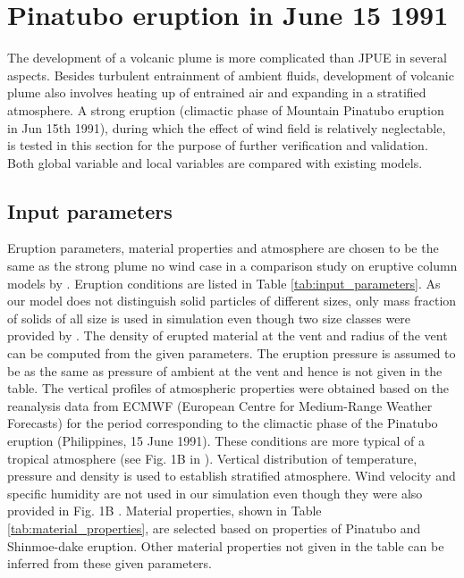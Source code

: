 \section{Pinatubo eruption in June 15 1991}
The development of a volcanic plume is more complicated than JPUE in several aspects. Besides turbulent entrainment of ambient fluids, development of volcanic plume also involves heating up of entrained air and expanding in a stratified atmosphere. A strong eruption (climactic phase of Mountain Pinatubo eruption in Jun 15th 1991), during which the effect of wind field is relatively neglectable, is tested in this section for the purpose of further verification and validation.
Both global variable and local variables are compared with existing models.

\subsection{Input parameters}
\label{input-parameter}
Eruption parameters, material properties and atmosphere are chosen to be the same as the strong plume no wind case in a comparison study on eruptive column models by \citet {costa2016results}. Eruption conditions are listed in Table \ref{tab:input_parameters}. As our model does not distinguish solid particles of different sizes, only mass fraction of solids of all size is used in simulation even though two size classes were provided by \citet {costa2016results}. The density of erupted material at the vent and radius of the vent can be computed from the given parameters. The eruption pressure is assumed to be as the same as pressure of ambient at the vent and hence is not given in the table. The vertical profiles of atmospheric properties were obtained based on the reanalysis data from ECMWF (European Centre for Medium-Range Weather Forecasts) for the period corresponding to the climactic phase of the Pinatubo eruption (Philippines, 15 June 1991). These conditions are more typical of a tropical atmosphere (see Fig. 1B in \citep{costa2016results}).  
Vertical distribution of temperature, pressure and density is used to establish stratified atmosphere. Wind velocity and specific humidity are not used in our simulation even though they were also provided in Fig. 1B \citep{costa2016results}. Material properties, shown in Table \ref{tab:material_properties}, are selected based on properties of Pinatubo and Shinmoe-dake eruption. Other material properties not given in the table can be inferred from these given parameters.

